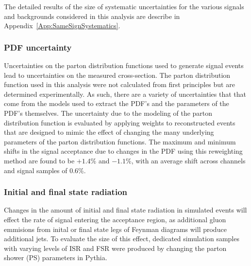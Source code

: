 The detailed results of the size of systematic uncertainties for the various signals and backgrounds
considered in this analysis are describe in Appendix~\ref{App:SameSignSystematics}.

\subsubsection{PDF uncertainty}
Uncertainties on the parton distribution functions used to generate signal events lead to uncertainties on the measured cross-section.
The parton distribution function used in this analysis were not calculated from first principles but are determined experimentally.
As such, there are a variety of uncertainties that that come from the models used to extract the PDF's
and the parameters of the PDF's themselves.
The uncertainty due to the modeling of the parton distribution function is evaluated by applying weights to reconstructed events
that are designed to mimic the effect of changing the many underlying parameters of the parton distribution functions.
The maximum and minimum shifts in the signal acceptance due to changes in the PDF using this reweighting method
are found to be $+1.4$\% and $-1.1$\%, with an average shift across channels and signal samples of 0.6\%.


\subsubsection{Initial and final state radiation}
Changes in the amount of initial and final state radiation in simulated events will
effect the rate of signal entering the acceptance region, as additional gluon
emmisions from inital or final state legs of Feynman diagrams will produce
additional jets.
To evaluate the size of this effect, dedicated simulation samples with varying levels of
ISR and FSR were produced by changing the parton shower (PS) parameters in Pythia.


